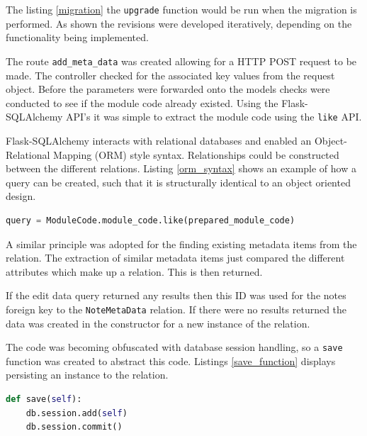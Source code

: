 {{{{{{{The listing \ref{migration} the \texttt{upgrade} function would be run when the migration is performed. As shown the revisions were developed iteratively, depending on the functionality being implemented.

The route \texttt{add_meta_data} was created allowing for a HTTP POST request to be made. The controller checked for the associated key values from the request object. Before the parameters were forwarded onto the models checks were conducted to see if the module code already existed. Using the Flask-SQLAlchemy \cite{citeulike:14025864} API's it was simple to extract the module code using the \texttt{like} API.



Flask-SQLAlchemy interacts with relational databases and enabled an Object-Relational Mapping (ORM) style syntax. Relationships could be constructed between the different relations. Listing \ref{orm_syntax} shows an example of how a query can be created, such that it is structurally identical to an object oriented design.

\begin{lstlisting}[language=python, caption={The module code class calls the module code attribute and compared its value against a prepared module code.}, label={orm_syntax}, breaklines, columns=fullflexible, keywordstyle=\color{blue}]
    query = ModuleCode.module_code.like(prepared_module_code)
\end{lstlisting}

A similar principle was adopted for the finding existing metadata items from the relation. The extraction of similar metadata items just compared the different attributes which make up a relation. This is then returned.

If the edit data query returned any results then this ID was used for the notes foreign key to the \texttt{NoteMetaData} relation. If there were no results returned the data was created in the constructor for a new instance of the relation.

The code was becoming obfuscated with database session handling, so a \texttt{save} function was created to abstract this code. Listings \ref{save_function} displays persisting an instance to the relation.
\begin{lstlisting}[language=python, caption={Save function that was abstracted to remove the db session handling from the controller}, label={save_function}, breaklines, columns=fullflexible, keywordstyle=\color{blue}]
  def save(self):
    db.session.add(self)
    db.session.commit()
\end{lstlisting}

}}}}}}}
